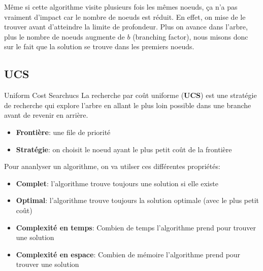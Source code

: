 \begin{remark}\leavevmode
    Même si cette algorithme visite plusieurs fois les mêmes noeuds, ça n'a pas vraiment d'impact
    car le nombre de noeuds est réduit. En effet, on mise de le trouver avant d'atteindre la limite de profondeur. 
    Plus on avance dans l'arbre, plus le nombre de noeuds augmente de $b$ (branching factor), nous misons donc sur le fait que la solution se trouve dans les premiers noeuds.
\end{remark}



\subsection{UCS} %
\label{sub:ucs} 

\begin{definition}{Uniform Cost Search}{ucs}
    La recherche par coût uniforme (\textbf{UCS}) est une stratégie de recherche qui explore l'arbre en allant le plus loin possible dans une branche avant de revenir en arrière. 
    \begin{itemize}
        \item \textbf{Frontière}: une file de priorité
        \item \textbf{Stratégie}: on choisit le noeud ayant le plus petit coût de la frontière
    \end{itemize} 
\end{definition} 




Pour ananlyser un algorithme, on va utilser ces différentes propriétés:
\begin{itemize}
    \item \textbf{Complet}: l'algorithme trouve toujours une solution si elle existe
    \item \textbf{Optimal}: l'algorithme trouve toujours la solution optimale (avec le plus petit coût)
    \item \textbf{Complexité en temps}: Combien de temps l'algorithme prend pour trouver une solution
    \item \textbf{Complexité en espace}: Combien de mémoire l'algorithme prend pour trouver une solution
\end{itemize}

